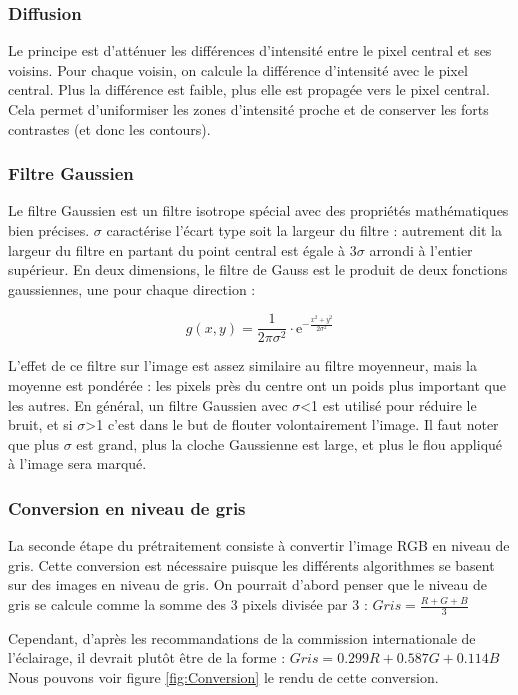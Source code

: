 \subsubsection*{Diffusion}

Le principe est d’atténuer les différences d'intensité entre le pixel central et ses voisins. Pour chaque voisin, on calcule la différence d'intensité avec le pixel central. Plus la différence est faible, plus elle est propagée vers le pixel central. Cela permet d'uniformiser les zones d'intensité proche et de conserver les forts contrastes (et donc les contours).

\subsubsection*{Filtre Gaussien}
\label{FiltreGaussien}

Le filtre Gaussien est un filtre isotrope spécial avec des propriétés mathématiques bien précises. $\sigma$ caractérise l'écart type soit la largeur du filtre : autrement dit la largeur du filtre en partant du point central est égale à 3$\sigma$ arrondi à l'entier supérieur. En deux dimensions, le filtre de Gauss est le produit de deux fonctions gaussiennes, une pour chaque direction :

$$g(x,y) = \frac{1}{2\pi\sigma^2}\cdot \mathrm{e}^{-\frac{x^2+y^2}{2\sigma^2}}$$

L’effet de ce filtre sur l’image est assez similaire au filtre moyenneur, mais la moyenne est pondérée : les pixels près du centre ont un poids plus important que les autres. En général, un filtre Gaussien avec $\sigma$<1 est utilisé pour réduire le bruit, et si $\sigma$>1 c’est dans le but de flouter volontairement l'image. Il faut noter que plus $\sigma$ est grand, plus la cloche Gaussienne est large, et plus le flou appliqué à l’image sera marqué.

\subsubsection{Conversion en niveau de gris}

La seconde étape du prétraitement consiste à convertir l’image RGB en niveau de gris. Cette conversion est nécessaire puisque les différents algorithmes se basent sur des images en niveau de gris. On pourrait d’abord penser que le niveau de gris se calcule comme la somme des 3 pixels divisée par 3 : $Gris = \frac{R + G + B}{3}$

Cependant, d’après les recommandations de la commission internationale de l’éclairage, il devrait plutôt être de la forme : $Gris = 0.299R + 0.587G + 0.114B$
Nous pouvons voir figure \ref{fig:Conversion} le rendu de cette conversion.

